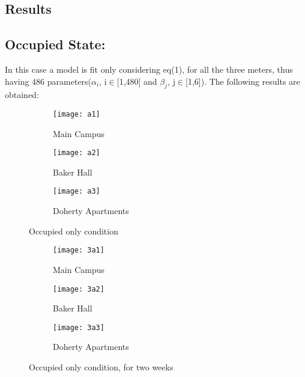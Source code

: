 \documentclass[a4paper,11pt]{article}
\begin{document}
\begin{itemize}
\section{Results}
\subsection{Occupied State:}
In this case a model is fit only considering eq(1), for all the three meters, thus having 486 parameters($\alpha_i$, i$\in$[1,480] and $\beta_j$, j$\in$[1,6]). The following results are obtained:
\begin{figure}[H]
        \centering
        \begin{subfigure}[b]{0.3\textwidth}
                \texttt{[image: a1]}
                \caption{Main Campus}
                \label{fig:Load 1}
        \end{subfigure}%
\hfill
        \begin{subfigure}[b]{0.3\textwidth}
                \texttt{[image: a2]}
                \caption{Baker Hall}
                \label{fig:tiger}
        \end{subfigure}
 \hfill       
        \begin{subfigure}[b]{0.35\textwidth}
                \texttt{[image: a3]}
                \caption{Doherty Apartments}
                \label{fig:tiger}
        \end{subfigure}
        \caption{Occupied only condition}\label{fig:animals}
\end{figure}


\begin{figure}[H]
        \centering
        \begin{subfigure}[b]{0.3\textwidth}
                \texttt{[image: 3a1]}
                \caption{Main Campus}
                \label{fig:Load 1}
        \end{subfigure}%
\hfill
        \begin{subfigure}[b]{0.3\textwidth}
                \texttt{[image: 3a2]}
                \caption{Baker Hall}
                \label{fig:tiger}
        \end{subfigure}
 \hfill       
        \begin{subfigure}[b]{0.35\textwidth}
                \texttt{[image: 3a3]}
                \caption{Doherty Apartments}
                \label{fig:tiger}
        \end{subfigure}
        \caption{Occupied only condition, for two weeks}\label{fig:animals}
\end{figure}


\end{itemize}
\end{document}

